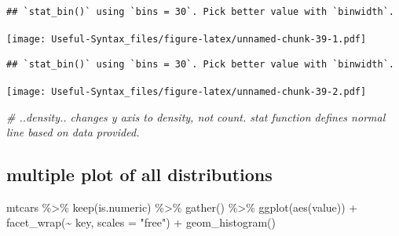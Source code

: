 \documentclass[
]{book}
\newenvironment{Shaded}{\begin{snugshade}}{\end{snugshade}}
\newcommand{\AttributeTok}[1]{\textcolor[rgb]{0.77,0.63,0.00}{#1}}
\newcommand{\CommentTok}[1]{\textcolor[rgb]{0.56,0.35,0.01}{\textit{#1}}}
\newcommand{\FunctionTok}[1]{\textcolor[rgb]{0.00,0.00,0.00}{#1}}
\newcommand{\NormalTok}[1]{#1}
\newcommand{\SpecialCharTok}[1]{\textcolor[rgb]{0.00,0.00,0.00}{#1}}
\newcommand{\StringTok}[1]{\textcolor[rgb]{0.31,0.60,0.02}{#1}}
\begin{document}
\begin{verbatim}
## `stat_bin()` using `bins = 30`. Pick better value with `binwidth`.
\end{verbatim}

\texttt{[image: Useful-Syntax\_files/figure-latex/unnamed-chunk-39-1.pdf]}

\begin{Shaded}
\end{Shaded}

\begin{verbatim}
## `stat_bin()` using `bins = 30`. Pick better value with `binwidth`.
\end{verbatim}

\texttt{[image: Useful-Syntax\_files/figure-latex/unnamed-chunk-39-2.pdf]}

\begin{Shaded}
\begin{Highlighting}[]
\CommentTok{\# ..density.. changes y axis to density, not count. stat function defines normal line based on data provided.}
\end{Highlighting}
\end{Shaded}

\hypertarget{multiple-plot-of-all-distributions}{%
\subsection{multiple plot of all distributions}\label{multiple-plot-of-all-distributions}}

\begin{Shaded}
\begin{Highlighting}[]
\NormalTok{mtcars }\SpecialCharTok{\%\textgreater{}\%} \FunctionTok{keep}\NormalTok{(is.numeric) }\SpecialCharTok{\%\textgreater{}\%} \FunctionTok{gather}\NormalTok{() }\SpecialCharTok{\%\textgreater{}\%} \FunctionTok{ggplot}\NormalTok{(}\FunctionTok{aes}\NormalTok{(value)) }\SpecialCharTok{+} \FunctionTok{facet\_wrap}\NormalTok{(}\SpecialCharTok{\textasciitilde{}}\NormalTok{ key, }\AttributeTok{scales =} \StringTok{"free"}\NormalTok{) }\SpecialCharTok{+} \FunctionTok{geom\_histogram}\NormalTok{()}
\end{Highlighting}
\end{Shaded}
\end{document}
